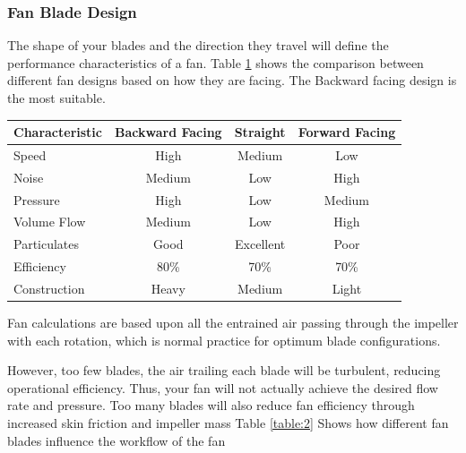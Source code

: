 \subsubsection{Fan Blade Design}

The shape of your blades and the direction they travel will define the performance characteristics of a fan. Table \ref{table:1} shows the comparison between different fan designs based on how they are facing. The Backward facing design is the most suitable. 

\begin{table}[ht]
  \begin{center}
    \leavevmode
     \begin{tabular}{| l | c | c | c |}\hline
      Characteristic & Backward Facing & Straight & Forward Facing \\
      \hline
         Speed   & High    & Medium &   Low\\
         \hline
         Noise & Medium & Low & High\\
         \hline
         Pressure & High & Low   & Medium  \\
         \hline
         Volume Flow & Medium & Low & High \\
         \hline
         Particulates & Good & Excellent & Poor \\
         \hline
         Efficiency & 80\% & 70\% & 70\% \\
         \hline
         Construction & Heavy & Medium & Light \\
    \hline
    \end{tabular}
    \label{table:1}
  \end{center}
\end{table}


Fan calculations are based upon all the entrained air passing through the impeller with each rotation, which is normal practice for optimum blade configurations.
\par
However, too few blades, the air trailing each blade will be turbulent, reducing operational efficiency. Thus, your fan will not actually achieve the desired flow rate and pressure.
Too many blades will also reduce fan efficiency through increased skin friction and impeller mass
Table \ref{table:2} Shows how different fan blades influence the workflow of the fan

